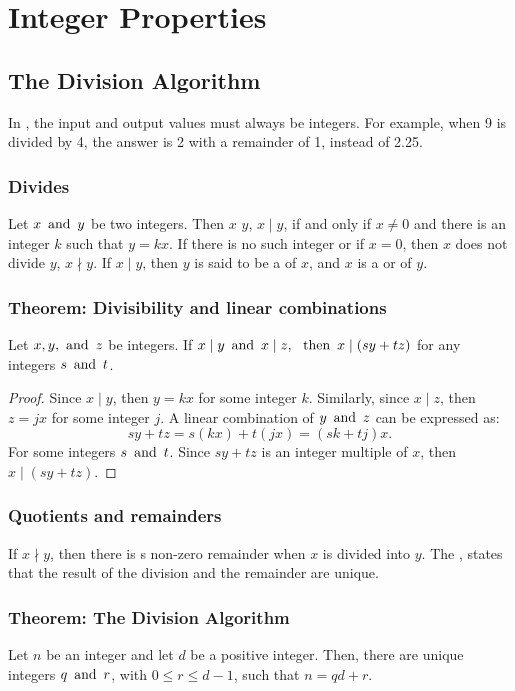 \section{Integer Properties}
\subsection{The Division Algorithm}
In , the input and output values must always be integers. For example, when 9 is divided by 4, the answer is 2 with a remainder of 1, instead of 2.25.

\subsubsection*{Divides}
Let $x \operatorname{~\text{and}~} y$ be two integers. Then $x$  $y$, $x \mid y$, if and only if $x \neq 0$ and there is an integer $k$ such that $y = kx$. If there is no such integer or if $x = 0$, then $x$ does not divide $y$, $x \nmid y$. If $x \mid y$, then $y$ is said to be a  of $x$, and $x$ is a  or  of $y$.

\subsubsection*{Theorem: Divisibility and linear combinations}
Let $x,y,\operatorname{~\text{and}~} z$ be integers. If $x \mid y \operatorname{~\text{and}~} x \mid z,~\operatorname{~\text{then}~} x \mid (sy+tz)$ for any integers $s \operatorname{~\text{and}~} t$.
\begin{proof}
    Since $x \mid y$, then $y = kx$ for some integer $k$. Similarly, since $x \mid z$, then $z = jx$ for some integer $j$. A linear combination of $y \operatorname{~\text{and}~} z$ can be expressed as:
    \[
        sy + tz = s(kx) + t(jx) = (sk + tj)x.
    \]
    For some integers $s \operatorname{~\text{and}~} t$. Since $sy + tz$ is an integer multiple of $x$, then $x \mid (sy + tz)$.
\end{proof}

\subsubsection*{Quotients and remainders}
If $x \nmid y$, then there is s non-zero remainder when $x$ is divided into $y$. The , states that the result of the division and the remainder are unique.

\subsubsection*{Theorem: The Division Algorithm}
Let $n$ be an integer and let $d$ be a positive integer. Then, there are unique integers $q \operatorname{~\text{and}~} r$, with $0 \leq r \leq d-1$, such that $n = qd + r$.

